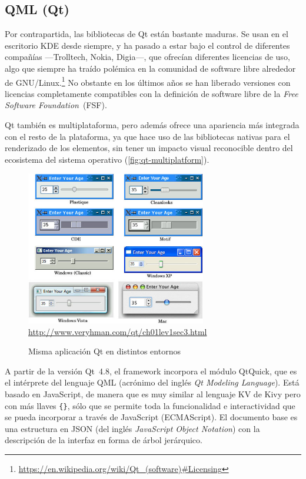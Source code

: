 \FloatBarrier
\newpage
\subsection{QML (Qt)}

Por contrapartida, las bibliotecas de Qt están bastante maduras. Se usan en el escritorio KDE desde siempre, y ha pasado a estar bajo el control de diferentes compañías ---Trolltech, Nokia, Digia---, que ofrecían diferentes licencias de uso, algo que siempre ha traído polémica en la comunidad de software libre alrededor de GNU/Linux.\footnote{\url{https://en.wikipedia.org/wiki/Qt_(software)\#Licensing}}
No obstante en los últimos años se han liberado versiones con licencias completamente compatibles con la definición de software libre de la \emph{Free Software Foundation}~(FSF).

Qt también es multiplataforma, pero además ofrece una apariencia más integrada con el resto de la plataforma, ya que hace uso de las bibliotecas nativas para el renderizado de los elementos, sin tener un impacto visual reconocible dentro del ecosistema del sistema operativo (\autoref{fig:qt-multiplatform}).


\begin{figure}[htbp]
\centering
\includegraphics[width=0.7\textwidth]{qt-multiplatform}
{\footnotesize\url{http://www.veryhman.com/qt/ch01lev1sec3.html}}
\caption{Misma aplicación Qt en distintos entornos}
\label{fig:qt-multiplatform}
\end{figure}

A partir de la versión Qt~4.8, el framework incorpora el módulo QtQuick, que es el intérprete del lenguaje QML (acrónimo del inglés \emph{Qt Modeling Language}). Está basado en JavaScript, de manera que es muy similar al lenguaje KV de Kivy pero con más llaves \verb={}=, sólo que se permite toda la funcionalidad e interactividad que se pueda incorporar a través de JavaScript (ECMAScript). El documento base es una estructura en JSON (del inglés \emph{JavaScript Object Notation}) con la descripción de la interfaz en forma de árbol jerárquico.

